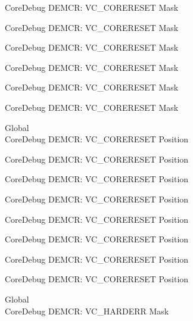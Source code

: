 \begin{DoxyRefList}
\label{deprecated__deprecated000214}%
%
Core\+Debug DEMCR\+: VC\+\_\+\+CORERESET Mask 

\label{deprecated__deprecated000277}%
%
Core\+Debug DEMCR\+: VC\+\_\+\+CORERESET Mask 

\label{deprecated__deprecated000356}%
%
Core\+Debug DEMCR\+: VC\+\_\+\+CORERESET Mask 

\label{deprecated__deprecated000432}%
%
Core\+Debug DEMCR\+: VC\+\_\+\+CORERESET Mask 

\label{deprecated__deprecated000521}%
%
Core\+Debug DEMCR\+: VC\+\_\+\+CORERESET Mask 

\label{deprecated__deprecated000623}%
%
Core\+Debug DEMCR\+: VC\+\_\+\+CORERESET Mask  
\item[Global \doxylink{group___c_m_s_i_s___core_debug_ga9fcf09666f7063a7303117aa32a85d5a}{Core\+Debug\+\_\+\+DEMCR\+\_\+\+VC\+\_\+\+CORERESET\+\_\+\+Pos} ]\hfill \\
\label{deprecated__deprecated000069}%
%
Core\+Debug DEMCR\+: VC\+\_\+\+CORERESET Position 

\label{deprecated__deprecated000137}%
%
Core\+Debug DEMCR\+: VC\+\_\+\+CORERESET Position 

\label{deprecated__deprecated000213}%
%
Core\+Debug DEMCR\+: VC\+\_\+\+CORERESET Position 

\label{deprecated__deprecated000276}%
%
Core\+Debug DEMCR\+: VC\+\_\+\+CORERESET Position 

\label{deprecated__deprecated000355}%
%
Core\+Debug DEMCR\+: VC\+\_\+\+CORERESET Position 

\label{deprecated__deprecated000431}%
%
Core\+Debug DEMCR\+: VC\+\_\+\+CORERESET Position 

\label{deprecated__deprecated000520}%
%
Core\+Debug DEMCR\+: VC\+\_\+\+CORERESET Position 

\label{deprecated__deprecated000622}%
%
Core\+Debug DEMCR\+: VC\+\_\+\+CORERESET Position  
\item[Global \doxylink{group___c_m_s_i_s___core_debug_ga803fc98c5bb85f10f0347b23794847d1}{Core\+Debug\+\_\+\+DEMCR\+\_\+\+VC\+\_\+\+HARDERR\+\_\+\+Msk} ]\hfill \\
\label{deprecated__deprecated000056}%
%
Core\+Debug DEMCR\+: VC\+\_\+\+HARDERR Mask 


\end{DoxyRefList}
